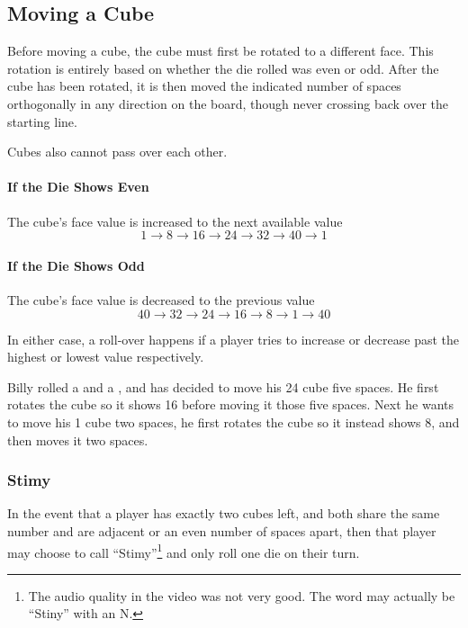 \subsection{Moving a Cube}
Before moving a cube, the cube must first be rotated to a different face.
This rotation is entirely based on whether the die rolled was even or odd.
After the cube has been rotated, it is then moved the indicated number of spaces orthogonally in any direction on the board, though never crossing back over the starting line.

Cubes also cannot pass over each other.

\paragraph{If the Die Shows Even} The cube's face value is increased to the next available value
$$1 \to 8 \to 16 \to 24 \to 32 \to 40 \to 1$$
\paragraph{If the Die Shows Odd} The cube's face value is decreased to the previous value
$$40 \to 32 \to 24 \to 16 \to 8 \to 1 \to 40$$

\note In either case, a roll-over happens if a player tries to increase or decrease past the highest or lowest value respectively.

\example Billy rolled a  and a , and has decided to move his 24 cube five spaces. He first rotates the cube so it shows 16 before moving it those five spaces. Next he wants to move his 1 cube two spaces, he first rotates the cube so it instead shows 8, and then moves it two spaces.

\subsubsection{Stimy}
In the event that a player has exactly two cubes left, and both share the same number and are adjacent or an even number of spaces apart, then that player may choose to call ``Stimy''\footnote{The audio quality in the video was not very good. The word may actually be ``Stiny'' with an N.} and only roll one die on their turn.
